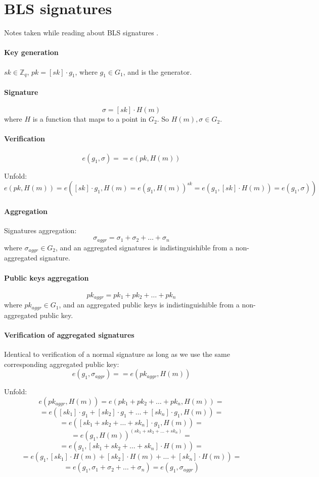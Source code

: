 \documentclass{article}
\theoremstyle{definition}
\begin{document}
\section{BLS signatures}
Notes taken while reading about BLS signatures \cite{bls-sig-eth2}.

\paragraph{Key generation}
$sk \in \mathbb{Z}_q$, $pk = [sk] \cdot g_1$, where $g_1 \in G_1$, and is the generator.

\paragraph{Signature}
$$\sigma = [sk] \cdot H(m)$$
where $H$ is a function that maps to a point in $G_2$. So $H(m), \sigma \in G_2$.

\paragraph{Verification}
$$e(g_1, \sigma) == e(pk, H(m))$$

Unfold:
$$e(pk, H(m)) = e([sk] \cdot g_1, H(m) = e(g_1, H(m))^{sk} = e(g_1, [sk] \cdot H(m)) = e(g_1, \sigma))$$

\paragraph{Aggregation}
Signatures aggregation:
$$\sigma_{aggr} = \sigma_1 + \sigma_2 + \ldots + \sigma_n$$
where $\sigma_{aggr} \in G_2$, and an aggregated signatures is indistinguishible from a non-aggregated signature.

\paragraph{Public keys aggregation}
$$pk_{aggr} = pk_1 + pk_2 + \ldots + pk_n$$
where $pk_{aggr} \in G_1$, and an aggregated public keys is indistinguishible from a non-aggregated public key.


\paragraph{Verification of aggregated signatures}
Identical to verification of a normal signature as long as we use the same corresponding aggregated public key:
$$e(g_1, \sigma_{aggr})==e(pk_{aggr}, H(m))$$

Unfold:
$$e(pk_{aggr}, H(m))=e(pk_1 + pk_2 + \ldots + pk_n, H(m))=$$
$$=e([sk_1] \cdot g_1 + [sk_2] \cdot g_1 + \ldots + [sk_n] \cdot g_1, H(m))=$$
$$=e([sk_1 + sk_2 + \ldots + sk_n] \cdot g_1, H(m))=$$
$$=e(g_1, H(m))^{(sk_1 + sk_2 + \ldots + sk_n)}=$$
$$=e(g_1, [sk_1 + sk_2 + \ldots + sk_n] \cdot H(m))=$$
$$=e(g_1, [sk_1] \cdot H(m) + [sk_2] \cdot H(m) + \ldots + [sk_n] \cdot H(m))=$$
$$=e(g_1, \sigma_1 + \sigma_2 + \ldots + \sigma_n)=e(g_1, \sigma_{aggr})$$






\end{document}

